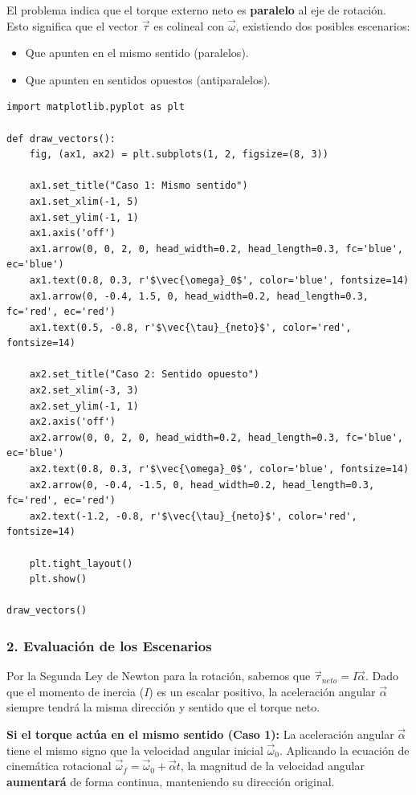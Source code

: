 \documentclass[12pt, a4paper]{article}
\begin{document}
El problema indica que el torque externo neto es \textbf{paralelo} al eje de rotación. Esto significa que el vector $\vec{\tau}$ es colineal con $\vec{\omega}$, existiendo dos posibles escenarios:
\begin{itemize}
    \item Que apunten en el mismo sentido (paralelos).
    \item Que apunten en sentidos opuestos (antiparalelos).
\end{itemize}

\begin{lstlisting}
import matplotlib.pyplot as plt

def draw_vectors():
    fig, (ax1, ax2) = plt.subplots(1, 2, figsize=(8, 3))
    
    ax1.set_title("Caso 1: Mismo sentido")
    ax1.set_xlim(-1, 5)
    ax1.set_ylim(-1, 1)
    ax1.axis('off')
    ax1.arrow(0, 0, 2, 0, head_width=0.2, head_length=0.3, fc='blue', ec='blue')
    ax1.text(0.8, 0.3, r'$\vec{\omega}_0$', color='blue', fontsize=14)
    ax1.arrow(0, -0.4, 1.5, 0, head_width=0.2, head_length=0.3, fc='red', ec='red')
    ax1.text(0.5, -0.8, r'$\vec{\tau}_{neto}$', color='red', fontsize=14)
    
    ax2.set_title("Caso 2: Sentido opuesto")
    ax2.set_xlim(-3, 3)
    ax2.set_ylim(-1, 1)
    ax2.axis('off')
    ax2.arrow(0, 0, 2, 0, head_width=0.2, head_length=0.3, fc='blue', ec='blue')
    ax2.text(0.8, 0.3, r'$\vec{\omega}_0$', color='blue', fontsize=14)
    ax2.arrow(0, -0.4, -1.5, 0, head_width=0.2, head_length=0.3, fc='red', ec='red')
    ax2.text(-1.2, -0.8, r'$\vec{\tau}_{neto}$', color='red', fontsize=14)

    plt.tight_layout()
    plt.show()

draw_vectors()
\end{lstlisting}

\subsubsection*{2. Evaluación de los Escenarios}
Por la Segunda Ley de Newton para la rotación, sabemos que $\vec{\tau}_{neto} = I \vec{\alpha}$. Dado que el momento de inercia ($I$) es un escalar positivo, la aceleración angular $\vec{\alpha}$ siempre tendrá la misma dirección y sentido que el torque neto.

\textbf{Si el torque actúa en el mismo sentido (Caso 1):}
La aceleración angular $\vec{\alpha}$ tiene el mismo signo que la velocidad angular inicial $\vec{\omega}_0$. Aplicando la ecuación de cinemática rotacional $\vec{\omega}_f = \vec{\omega}_0 + \vec{\alpha}t$, la magnitud de la velocidad angular \textbf{aumentará} de forma continua, manteniendo su dirección original.
\end{document}
